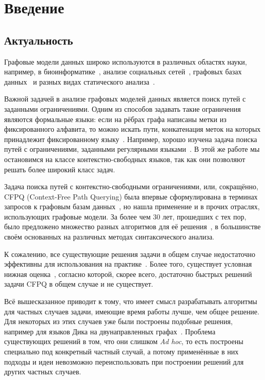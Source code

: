\section*{Введение}

\subsection*{Актуальность}

Графовые модели данных широко используются в различных областях науки, например, в биоинформатике~\cite{Sevon08}, анализе социальных сетей~\cite{Zarrinkalam14, Chaudhary16}, графовых базах данных~\cite{Medeiros18,Yannakakis1990} и разных видах статического анализа~\cite{Reps1998}. 

Важной задачей в анализе графовых моделей данных является поиск путей с заданными ограничениями. Одним из способов задавать такие ограничения являются формальные языки: если на рёбрах графа написаны метки из фиксированного алфавита, то можно искать пути, конкатенация меток на которых принадлежит фиксированному языку~\cite{Barrett00}. Например, хорошо изучена задача поиска путей с ограничениями, заданными регулярными языками~\cite{Mendelzon1995}. В этой же работе мы остановимся на классе контекстно-свободных языков, так как они позволяют решать более широкий класс задач.

Задача поиска путей с контекстно-свободными ограничениями, или, сокращённо, CFPQ (Context-Free Path Querying) была впервые сформулирована в терминах запросов к графовым базам данных~\cite{Yannakakis1990}, но нашла применение и в прочих отраслях, использующих графовые модели. За более чем 30 лет, прошедших с тех пор, было предложено множество разных алгоритмов для её решения~\cite{Reps97, Hellings15, Santos18}, в большинстве своём основанных на различных методах синтаксического анализа. 

К сожалению, все существующие решения задачи в общем случае недостаточно эффективны для использования на практике~\cite{Kuijpers19}. Более того, существует условная нижная оценка~\cite{Heintze1997}, согласно которой, скорее всего, достаточно быстрых решений задачи CFPQ в общем случае и не существует.

Всё вышесказанное приводит к тому, что имеет смысл разрабатывать алгоритмы для частных случаев задачи, имеющие время работы лучше, чем общее решение. Для некоторых из этих случаев уже были построены подобные решения, например для языков Дика на двунаправленных графах~\cite{Yuan09,Chatterjee17}. Проблема существующих решений в том, что они слишком \textit{Ad hoc}, то есть построены специально под конкретный частный случай, а потому применённые в них подходы и идеи невозможно переиспользовать при построении решений для других частных случаев.  

